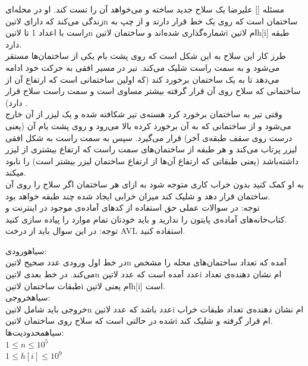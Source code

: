 

‌مسئله []
علیرضا یک سلاح جدید ساخته و می‌خواهد آن را تست کند. او در محله‌ای زندگی می‌کند که دارای ‌لاتین{n} ساختمان است که روی یک خط قرار دارند و از چپ به راست با اعداد 1 تا ‌لاتین{n} شماره‌گذاری شده‌اند و ساختمان ‌لاتین{i} ام ‌لاتین{h[i]} طبقه دارد. \\
طرز کار این سلاح به این شکل است که روی پشت بام یکی از ساختمان‌ها مستقر می‌شود و به سمت راست شلیک می‌کند. تیر در مسیر افقی به حرکت خود ادامه می‌دهد تا به یک ساختمان برخورد کند (که اولین ساختمانی است که ارتفاع آن از ساختمانی که سلاح روی آن قرار گرفته بیشتر مساوی است و سمت راست سلاح قرار دارد) . \\
وقتی تیر به ساختمان برخورد کرد هسته‌ی تیر شکافته شده و یک لیزر از آن خارج می‌شود و از ساختمانی که به آن برخورد کرده بالا می‌رود و روی پشت یام آن (یعنی درست روی سقف طبقه‌ی آخر) قرار می‌گیرد. سپس به سمت راست به شکل افقی لیزر پرتاب می‌کند و هر طبقه‌ از ساختمان‌های سمت راست که ارتفاع بیشتری از لیزر داشته‌باشد (یعنی طبقاتی که ارتفاع آن‌ها از ارتفاع ساختمان لیزر بیشتر است) را نابود میکند.\\
به او کمک کنید بدون خراب کاری متوجه شود به ازای هر ساختمان اگر سلاح را روی آن ساختمان قرار دهد و شلیک کند میزان خرابی ایجاد شده چند طبقه خواهد بود.\\
توجه‌: در سوالات عملی حق استفاده از کد‌های آماده‌ی موجود در اینترنت و کتاب‌خانه‌های آماده‌ی پایتون را ندارید و باید خودتان تمام موارد را پیاده سازی کنید.\\
توجه‌:  در این سوال باید از درخت AVL استفاده کنید.

‌سیاه{ورودی:}\\
در خط اول ورودی عدد صحیح ‌لاتین{n} آمده که تعداد ساختمان‌های محله را مشخص می‌کند.
در خط بعدی ‌لاتین{n} عدد آمده است که عدد ‌لاتین{i} ام نشان دهنده‌ی تعداد طبقات ساختمان ‌لاتین{i} ام یعنی ‌لاتین{h[i]} است.\\
‌سیاه{خروجی:}\\
خروجی باید شامل ‌لاتین{n} عدد باشد که عدد ‌لاتین{i} ام نشان دهنده‌ی تعداد طبقات خراب شده در حالتی است که سلاح روی ساختمان ‌لاتین{i} ام قرار گرفته و شلیک کند.\\
‌سیاه{محدودیت‌ها:}\\
$1 \leq n \leq 10^{5}$\\
$1 \leq h[i] \leq 10^{9}$\\

